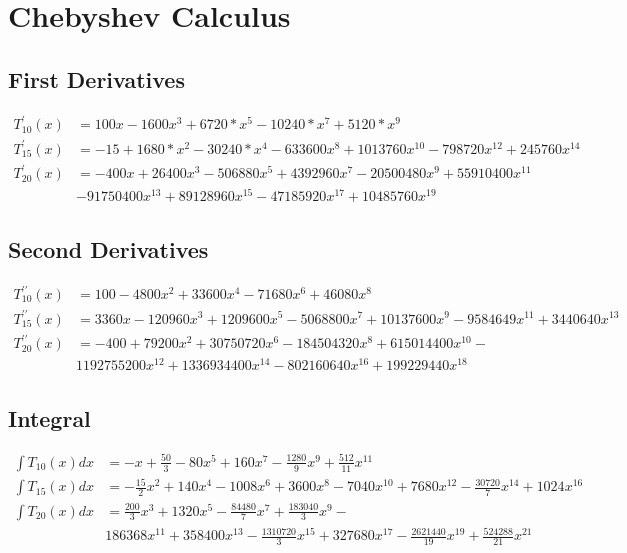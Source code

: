 \documentclass[12pt]{article}
\begin{document}
  \clearpage

  \section{Chebyshev Calculus}


  \subsection{First Derivatives}
  \begin{align}
    T_{10}^\prime(x) &= 100x-1600x^3+6720*x^5-10240*x^7+5120*x^9 \nonumber \\
    T_{15}^\prime(x) &= -15+1680*x^2-30240*x^4-633600x^8+1013760x^{10}-798720x^{12}+245760x^{14} \nonumber \\
    T_{20}^\prime(x) &= -400x+26400x^3-506880x^5+4392960x^7-20500480x^9+55910400x^{11}\\&-91750400x^{13}+89128960x^{15}-47185920x^{17}+10485760x^{19} \nonumber
  \end{align}  

  \subsection{Second Derivatives}
  \begin{align}
    T_{10}^{\prime\prime}(x) &= 100-4800x^2+33600x^4-71680x^6+46080x^8 \nonumber \\
    T_{15}^{\prime\prime}(x) &= 3360x-120960x^3+1209600x^5-5068800x^7+10137600x^9-9584649x^{11}+3440640x^{13} \nonumber\\
    T_{20}^{\prime\prime}(x) &= -400+79200x^2+30750720x^6-184504320x^8+615014400x^{10}-\\&1192755200x^{12}+1336934400x^{14}-802160640x^{16}+199229440x^{18} \nonumber
  \end{align}  

  \subsection{Integral}
  \begin{align}
    \int T_{10}(x)dx &= -x+\frac{50}{3}-80x^5+160x^7-\frac{1280}{9}x^9+\frac{512}{11}x^{11} \nonumber \\
    \int T_{15}(x)dx &= -\frac{15}{2}x^2+140x^4-1008x^6+3600x^8-7040x^{10}+7680x^{12}-\frac{30720}{7}x^{14}+1024x^{16} \nonumber \\
    \int T_{20}(x)dx &= \frac{200}{3}x^3+1320x^5-\frac{84480}{7}x^7+\frac{183040}{3}x^9-\\&186368x^{11}+358400x^{13}-\frac{1310720}{3}x^{15}+327680x^{17}-\frac{2621440}{19}x^{19}+\frac{524288}{21}x^{21} \nonumber
  \end{align}
\end{document}
